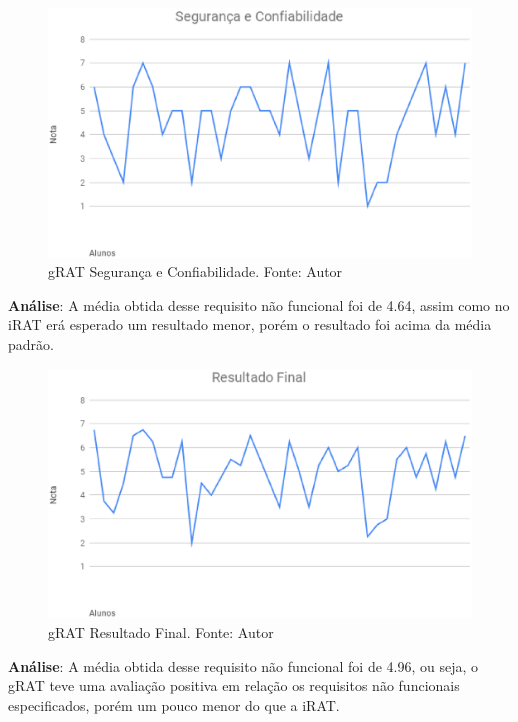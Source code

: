 \begin{figure}[H]
	\centering
  \includegraphics[keepaspectratio=true,scale=0.5]{figuras/gRAT_Seguranca_e_Confiabilidade.eps}
  \caption[gRAT Segurança e Confiabilidade.]{gRAT Segurança e Confiabilidade. Fonte: Autor}
\end{figure}

\textbf{Análise}: A média obtida desse requisito não funcional foi de 4.64, assim como no iRAT erá esperado um resultado menor, porém o
resultado foi acima da média padrão.

\begin{figure}[H]
	\centering
  \includegraphics[keepaspectratio=true,scale=0.5]{figuras/gRAT_Resultado_Final.eps}
  \caption[gRAT Resultado Final.]{gRAT Resultado Final. Fonte: Autor}
\end{figure}

\textbf{Análise}: A média obtida desse requisito não funcional foi de 4.96, ou seja, o gRAT teve uma avaliação
positiva em relação os requisitos não funcionais especificados, porém um pouco menor do que a iRAT.


